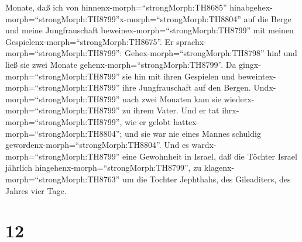 Monate, daß ich von hinnenx-morph=``strongMorph:TH8685''
hinabgehex-morph=``strongMorph:TH8799''x-morph=``strongMorph:TH8804''
auf die Berge und meine Jungfrauschaft
beweinex-morph=``strongMorph:TH8799'' mit meinen
Gespielenx-morph=``strongMorph:TH8675''.  Er
sprachx-morph=``strongMorph:TH8799'': Gehex-morph=``strongMorph:TH8798''
hin! und ließ sie zwei Monate gehenx-morph=``strongMorph:TH8799''. Da
gingx-morph=``strongMorph:TH8799'' sie hin mit ihren Gespielen und
beweintex-morph=``strongMorph:TH8799'' ihre Jungfrauschaft auf den
Bergen.  Undx-morph=``strongMorph:TH8799'' nach zwei
Monaten kam sie wiederx-morph=``strongMorph:TH8799'' zu ihrem Vater. Und
er tat ihrx-morph=``strongMorph:TH8799'', wie er gelobt
hattex-morph=``strongMorph:TH8804''; und sie war nie eines Mannes
schuldig gewordenx-morph=``strongMorph:TH8804''. Und es
wardx-morph=``strongMorph:TH8799'' eine Gewohnheit in Israel,
 daß die Töchter Israel jährlich
hingehenx-morph=``strongMorph:TH8799'', zu
klagenx-morph=``strongMorph:TH8763'' um die Tochter Jephthahs, des
Gileaditers, des Jahres vier Tage.

\hypertarget{section-11}{%
\section{12}\label{section-11}}

